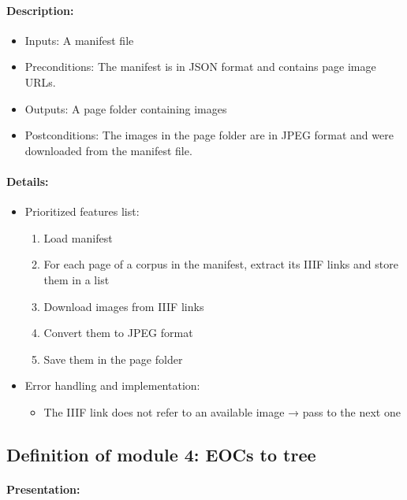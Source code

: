 \documentclass{polytech/polytech}
\numberwithin{figure}{chapter}
\begin{document}
\begin{appendix}
\paragraph{Description:}
 
\begin{itemize}
    \item Inputs: A manifest file
    \item Preconditions: The manifest is in JSON format and contains page image URLs.
    \item Outputs: A page folder containing images
    \item Postconditions: The images in the page folder are in JPEG format and were downloaded from the manifest file.
\end{itemize}

\paragraph{Details:}

\begin{itemize}
    \item Prioritized features list: 
    \begin{enumerate}
        \item	Load manifest
        \item	For each page of a corpus in the manifest, extract its IIIF links and store them in a list
        \item	Download images from IIIF links
        \item	Convert them to JPEG format
        \item	Save them in the page folder
    \end{enumerate}
    \item Error handling and implementation: 
    \begin{itemize}
        \item	The IIIF link does not refer to an available image → pass to the next one
    \end{itemize}
\end{itemize}


\subsection{Definition of module 4: EOCs to tree}

\paragraph{Presentation:}
 

\end{appendix}
\end{document}
